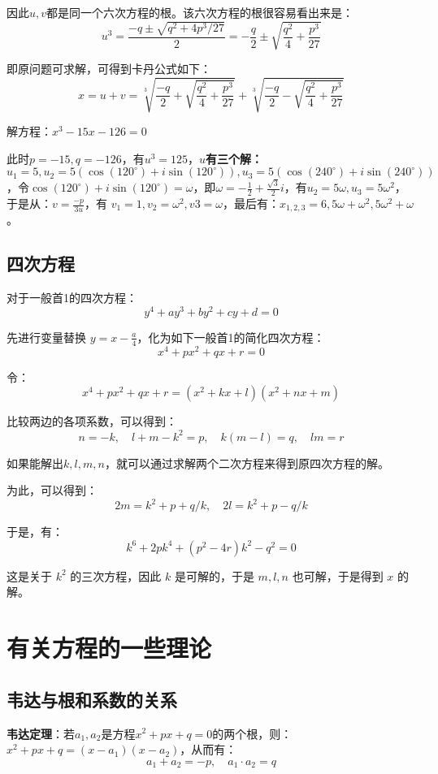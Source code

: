 \documentclass[12pt]{article}
\begin{document}
因此$u,v$都是同一个六次方程的根。该六次方程的根很容易看出来是：
$$
u^3 = \frac{-q \pm \sqrt{q^2 + 4p^3/27}}{2} = -\frac{q}{2} \pm \sqrt{\frac{q^2}{4} + \frac{p^3}{27}}
$$

即原问题可求解，可得到卡丹公式如下：
$$
x = u+v = \sqrt[3]{\frac{-q}{2} + \sqrt{\frac{q^2}{4} + \frac{p^3}{27}}} + \sqrt[3]{\frac{-q}{2} - \sqrt{\frac{q^2}{4} + \frac{p^3}{27}}} 
$$

\begin{framed}  
\small{
解方程：$x^3 - 15x - 126 = 0$

此时$p = -15, q = -126$，有$u^3 = 125$，\textbf{$u$有三个解：$u_1 = 5, u_2 = 5(\cos(120^\circ) + i\sin(120^\circ)), u_3 = 5(\cos(240^\circ) + i\sin(240^\circ))$}，令$\cos(120^\circ) + i\sin(120^\circ) = \omega$，即$\omega = -\frac{1}{2} + \frac{\sqrt{3}}{2}i$，有$u_2 = 5\omega, u_3 = 5\omega^2$，于是从：$v = \frac{-p}{3u}$，有 $v_1 = 1, v_2 = \omega^2, v3 = \omega$，最后有：$x_{1,2,3} = 6, 5\omega+\omega^2, 5\omega^2 + \omega$。
}
\end{framed}

\subsection{四次方程}
对于一般首1的四次方程：
$$
y^4 + ay^3 + by^2 + cy + d = 0
$$

先进行变量替换 $y = x - \frac{a}{4}$，化为如下一般首1的简化四次方程：
$$
x^4 + px^2 + qx + r = 0
$$

令：
$$
x^4 + px^2 + qx + r = (x^2 + kx + l)(x^2 + nx + m)
$$

比较两边的各项系数，可以得到：
$$
n = -k, \quad l + m - k^2 = p, \quad k(m-l) = q, \quad lm = r
$$

如果能解出$k,l,m,n$，就可以通过求解两个二次方程来得到原四次方程的解。

为此，可以得到：
$$
2m = k^2 + p + q/k, \quad 2l = k^2 + p - q/k
$$

于是，有：
$$
k^6 + 2pk^4 + (p^2 - 4r)k^2 - q^2 = 0
$$

这是关于 $k^2$ 的三次方程，因此 $k$ 是可解的，于是 $m, l, n$ 也可解，于是得到 $x$ 的解。

\section{有关方程的一些理论}
\subsection{韦达与根和系数的关系}
\textbf{韦达定理}：若$a_1, a_2$是方程$x^2 + px + q=0$的两个根，则：$x^2 + px + q = (x - a_1)(x - a_2)$，从而有：
$$
a_1 + a_2 = -p, \quad a_1\cdot a_2 = q
$$
\end{document}
